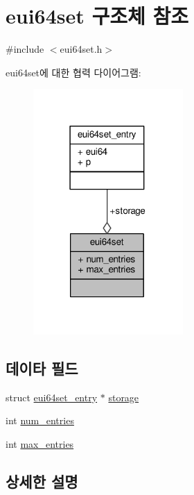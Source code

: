 \hypertarget{structeui64set}{}\section{eui64set 구조체 참조}
\label{structeui64set}


{\ttfamily \#include $<$eui64set.\+h$>$}



eui64set에 대한 협력 다이어그램\+:
\nopagebreak
\begin{figure}[H]
\begin{center}
\leavevmode
\includegraphics[width=162pt]{structeui64set__coll__graph}
\end{center}
\end{figure}
\subsection*{데이타 필드}
\begin{DoxyCompactItemize}
\item 
struct \hyperlink{structeui64set__entry}{eui64set\+\_\+entry} $\ast$ \hyperlink{structeui64set_a91b846e2ce1674f8b282c22afcbd7906}{storage}
\item 
int \hyperlink{structeui64set_afb132bf5c80cf684818f5a032257faa3}{num\+\_\+entries}
\item 
int \hyperlink{structeui64set_aa71009e2224e8733f65e5d7c09f0a1a8}{max\+\_\+entries}
\end{DoxyCompactItemize}


\subsection{상세한 설명}


